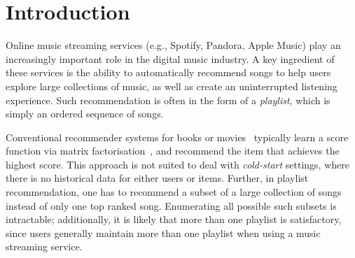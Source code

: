
\section{Introduction}
\label{sec:intro}
Online music streaming services (e.g., Spotify, Pandora, Apple Music) %
play an increasingly important role in the digital music industry.
A key ingredient of these services is the ability to automatically recommend songs to help users explore large collections of music,
as well as create an uninterrupted listening experience.
Such recommendation is often in the form of a \emph{playlist}, which is simply an ordered sequence of songs.

Conventional recommender systems for books or movies~\citep{Sarwar:2001,Netflix}
typically learn a score function via matrix factorisation~\citep{Koren:2009},
and recommend the item that achieves the highest score.
This approach is not suited to deal with \emph{cold-start} settings,
where there is no historical data for either users or items.
%
Further, in playlist recommendation,
one has to recommend a subset of a large collection of songs instead of only one top ranked song.
Enumerating all possible such subsets is intractable;
additionally,
it is likely that more than one playlist is satisfactory, since
users generally maintain more than one playlist when using a music streaming service.


